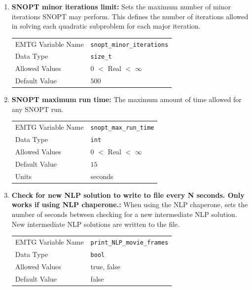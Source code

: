 \begin{enumerate}
    \item \textbf{\ac{SNOPT} minor iterations limit:} Sets the maximum number of minor iterations \ac{SNOPT} may perform. This defines the number of iterations allowed in solving each quadratic subproblem for each major iteration.
    \begin{table}[H]
        \hspace{2cm}
        \begin{tabular}{lp{5cm}}
        \ac{EMTG} Variable Name & \verb|snopt_minor_iterations| \\
        Data Type & \verb|size_t| \\
        Allowed Values & $0$ $<$ Real $<$ $\infty$ \\
        Default Value & $500$ \\
        \end{tabular}
    \end{table}
    
    \item \textbf{\ac{SNOPT} maximum run time:} The maximum amount of time allowed for any \ac{SNOPT} run.
    \begin{table}[H]
        \hspace{2cm}
        \begin{tabular}{lp{5cm}}
        \ac{EMTG} Variable Name & \verb|snopt_max_run_time| \\
        Data Type & \verb|int| \\
        Allowed Values & $0$ $<$ Real $<$ $\infty$ \\
        Default Value & $15$ \\
        Units & seconds
        \end{tabular}
    \end{table}
    
    \item \textbf{Check for new \ac{NLP} solution to write to file every N seconds. Only works if using \ac{NLP} chaperone.:} When using the \ac{NLP} chaperone, sets the number of seconds between checking for a new intermediate \ac{NLP} solution. New intermediate \ac{NLP} solutions are written to the file.
    \begin{table}[H]
        \hspace{2cm}
        \begin{tabular}{lp{5cm}}
        \ac{EMTG} Variable Name & \verb|print_NLP_movie_frames| \\
        Data Type & \verb|bool| \\
        Allowed Values & true, false \\
        Default Value & false \\
        \end{tabular}
    \end{table}
    

\end{enumerate}
